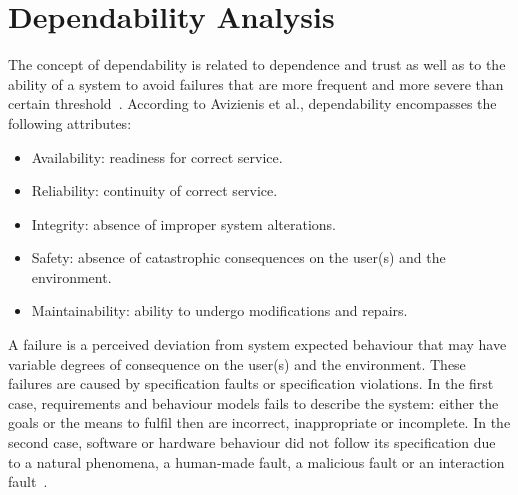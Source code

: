 
\section{Dependability Analysis}

The concept of dependability is related to dependence and trust as well as to the ability of a system to avoid failures that are more frequent and more severe than certain threshold~\cite{Laprie2004}. According to Avizienis et al., dependability encompasses the following attributes: 

\begin{itemize}

\item Availability: readiness for correct service.
\medskip

\item Reliability: continuity of correct service.
\medskip

\item Integrity: absence of improper system alterations.
\medskip

\item Safety: absence of catastrophic consequences on the user(s) and the environment.
\medskip

\item Maintainability: ability to undergo modifications and repairs.
\medskip

\end{itemize}



A failure is a perceived deviation from system expected behaviour that may have variable degrees of consequence on the user(s) and the environment. These failures are caused by specification faults or specification violations. In the first case, requirements and behaviour models fails to describe the system: either the goals or the means to fulfil then are incorrect, inappropriate or incomplete. In the second case, software or hardware behaviour did not follow its specification due to a natural phenomena, a human-made fault, a malicious fault or an interaction fault~\cite{Laprie2004}.

